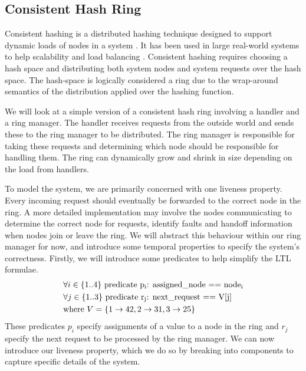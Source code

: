 \subsection{Consistent Hash Ring}
Consistent hashing is a distributed hashing technique designed to support dynamic loads of nodes in a system \cite{consistent_hash}. It has been used in large real-world systems to help scalability and load balancing \cite{dynamo}. Consistent hashing requires choosing a hash space and distributing both system nodes and system requests over the hash space. The hash-space is logically considered a ring due to the wrap-around semantics of the distribution applied over the hashing function.
\par
We will look at a simple version of a consistent hash ring involving a handler and a ring manager. The handler receives requests from the outside world and sends these to the ring manager to be distributed. The ring manager is responsible for taking these requests and determining which node should be responsible for handling them. The ring can dynamically grow and shrink in size depending on the load from handlers.
\par
To model the system, we are primarily concerned with one liveness property. Every incoming request should eventually be forwarded to the correct node in the ring. A more detailed implementation may involve the nodes communicating to determine the correct node for requests, identify faults and handoff information when nodes join or leave the ring. We will abstract this behaviour within our ring manager for now, and introduce some temporal properties to specify the system's correctness. Firstly, we will introduce some predicates to help simplify the LTL formulae.
\[
    \begin{aligned}
    & \forall i \in \{1..4\} \ \text{predicate p\textsubscript{i}: assigned\_node == node\textsubscript{i}} \\
    & \forall j \in \{1..3\} \ \text{predicate r\textsubscript{j}: next\_request == V[j]} \\
    & \text{where } V = \{1 \rightarrow 42, 2 \rightarrow 31, 3 \rightarrow 25\}
    \end{aligned}
\]
These predicates $p_i$ specify assignments of a value to a node in the ring and $r_j$ specify the next request to be processed by the ring manager. We can now introduce our liveness property, which we do so by breaking into components to capture specific details of the system.

